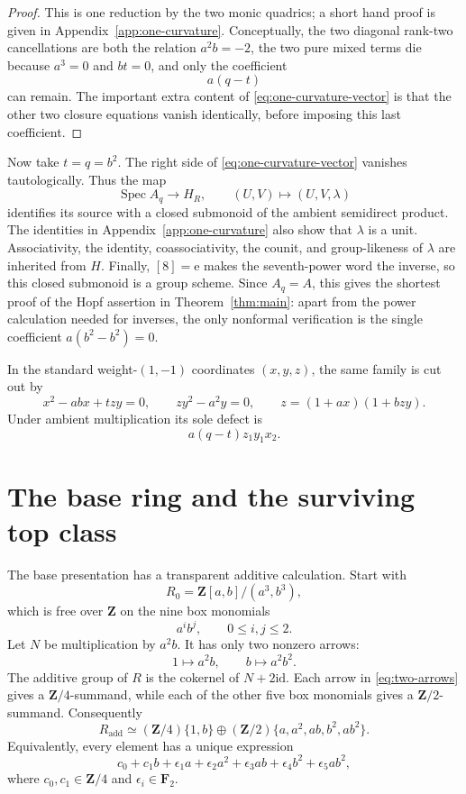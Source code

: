 \documentclass[11pt]{amsart}
\theoremstyle{definition}
\theoremstyle{remark}
\newcommand{\Z}{\mathbf Z}
\newcommand{\F}{\mathbf F}
\newcommand{\Spec}{\operatorname{Spec}}
\newcommand{\id}{\mathrm{id}}
\newcommand{\unit}{\mathrm e}
\begin{document}
\begin{proof}
This is one reduction by the two monic quadrics; a short hand proof is
given in Appendix~\ref{app:one-curvature}.  Conceptually, the two diagonal
rank-two cancellations are both the relation \(a^2b=-2\), the two pure
mixed terms die because \(a^3=0\) and \(bt=0\), and only the coefficient
\[
 a(q-t)
\]
can remain.  The important extra content of
\eqref{eq:one-curvature-vector} is that the other two closure equations
vanish identically, before imposing this last coefficient.
\end{proof}

Now take \(t=q=b^2\).  The right side of
\eqref{eq:one-curvature-vector} vanishes tautologically.  Thus the map
\[
 \Spec A_q\longrightarrow H_R,
 \qquad
 (U,V)\longmapsto(U,V,\lambda)
\]
identifies its source with a closed submonoid of the ambient semidirect
product.  The identities in Appendix~\ref{app:one-curvature} also show
that \(\lambda\) is a unit.  Associativity, the identity, coassociativity,
the counit, and group-likeness of \(\lambda\) are inherited from \(H\).
Finally, \([8]=\unit\) makes the seventh-power word the inverse, so this
closed submonoid is a group scheme.  Since \(A_q=A\), this gives the
shortest proof of the Hopf assertion in Theorem~\ref{thm:main}: apart from
the power calculation needed for inverses, the only nonformal
verification is the single coefficient \(a(b^2-b^2)=0\).

In the standard weight-\((1,-1)\) coordinates \((x,y,z)\), the same family
is cut out by
\[
 x^2-abx+tzy=0,\qquad zy^2-a^2y=0,\qquad
 z=(1+ax)(1+bzy).
\]
Under ambient multiplication its sole defect is
\[
 a(q-t)z_1y_1x_2.
\]

\section{The base ring and the surviving top class}
\label{sec:base}

The base presentation has a transparent additive calculation.  Start with
\[
 R_0=\Z[a,b]/(a^3,b^3),
\]
which is free over \(\Z\) on the nine box monomials
\[
 a^ib^j,\qquad 0\le i,j\le2.
\]
Let \(N\) be multiplication by \(a^2b\).  It has only two nonzero arrows:
\begin{equation}\label{eq:two-arrows}
 1\longmapsto a^2b,\qquad
 b\longmapsto a^2b^2.
\end{equation}
The additive group of \(R\) is the cokernel of \(N+2\id\).
Each arrow in \eqref{eq:two-arrows} gives a \(\Z/4\)-summand, while each
of the other five box monomials gives a \(\Z/2\)-summand.  Consequently
\begin{equation}\label{eq:additive-R}
 R_{\mathrm{add}}\simeq
 (\Z/4)\{1,b\}\oplus
 (\Z/2)\{a,a^2,ab,b^2,ab^2\}.
\end{equation}
Equivalently, every element has a unique expression
\[
 c_0+c_1b+
 \epsilon_1a+\epsilon_2a^2+\epsilon_3ab+
 \epsilon_4b^2+\epsilon_5ab^2,
\]
where \(c_0,c_1\in\Z/4\) and \(\epsilon_i\in\F_2\).
\end{document}
